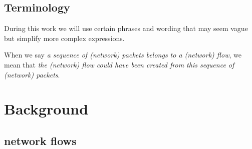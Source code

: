 \documentclass[
	ngerman,
	ruledheaders=section,%
	class=report,%
	thesis={type=bachelor},%
	accentcolor=9c,%
	custommargins=true,%
	marginpar=false,%
	parskip=half-,%
	fontsize=11pt,%
]{tudapub}
\begin{document}
\section{Terminology}
During this work we will use certain phrases and wording that may seem vague but simplify more complex expressions.

When we say \textit{a sequence of (network) packets belongs to a (network) flow}, we mean that \textit{the (network) flow could have been created from this sequence of (network) packets}.

\chapter{Background}


%
%

\section{network flows}
\end{document}
